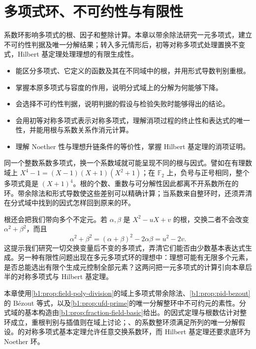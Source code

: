 
\chapter{多项式环、不可约性与有限性}
\label{b1:ch:12}

\begin{chapterabstract}
	系数环影响多项式的根、因子和整除计算。本章以带余除法研究一元多项式，建立不可约性判据及唯一分解结果；转入多元情形后，初等对称多项式处理置换不变式，Hilbert 基定理处理理想的有限生成性。
\end{chapterabstract}

\begin{learninggoals}
	\begin{itemize}
		\item 能区分多项式、它定义的函数及其在不同域中的根，并用形式导数判别重根。
		\item 掌握本原多项式与容度的作用，说明分式域上的分解为何能够下降。
		\item 会选择不可约性判据，说明判据的假设与检验失败时能够得出的结论。
		\item 会用初等对称多项式表示对称多项式，理解消项过程的终止性和表达式的唯一性，并能用根与系数关系作消元计算。
		\item 理解 Noether 性与理想升链条件的等价性，掌握 Hilbert 基定理的消项证明。
	\end{itemize}
\end{learninggoals}

同一个整数系数多项式，换一个系数域就可能呈现不同的根与因式。譬如在有理数域上 \(X^4-1=(X-1)(X+1)(X^2+1)\)；在 \(\mathbb F_2\) 上，负号与正号相同，整个多项式竟是 \((X+1)^4\)。根的个数、重数与可分解性因此都离不开系数所在的环。带余除法和形式导数使这些差别可以精确计算；当系数来自整环时，还须弄清在分式域中找到的因式怎样回到原来的环。

\ProseParagraphBreak
根还会把我们带向多个不定元。若 \(\alpha,\beta\) 是 \(X^2-uX+v\) 的根，交换二者不会改变 \(\alpha^2+\beta^2\)，而且
\[
	\alpha^2+\beta^2=(\alpha+\beta)^2-2\alpha\beta=u^2-2v.
\]
这提示我们研究一切交换变量后不变的多项式，弄清它们能否由少数基本表达式生成。另一种有限性问题出现在多元多项式环的理想中：理想可能有无限多个元素，是否总能选出有限个生成元控制全部元素？这两问把一元多项式的计算引向本章后半的对称多项式与 Hilbert 基定理。

\ProseParagraphBreak

本章使用\cref{b1:prop:field-poly-division}的域上多项式带余除法、\cref{b1:prop:pid-bezout}的 Bézout 等式，以及\cref{b1:prop:ufd-prime}的唯一分解整环中不可约元的素性。分式域的基本构造由\cref{b1:prop:fraction-field-basic}给出。的因式定理与根数估计对整环成立，重根判别与插值则在域上讨论；、的系数整环须满足所列的唯一分解假设。的对称多项式基本定理允许任意交换系数环，而 Hilbert 基定理还要求底环为 Noether 环。

